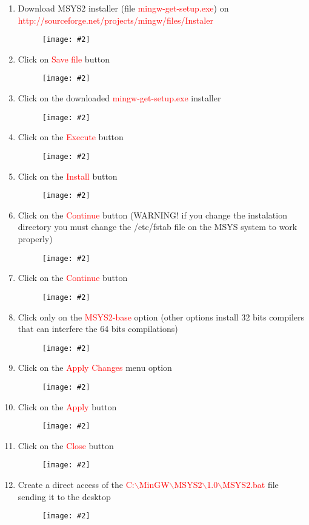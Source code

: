 \documentclass[a4paper]{article}
\newcommand{\FIG}[2]
{
	\begin{figure}[ht!]
	\centering
	\texttt{[image: \#2]}
	\end{figure}
}
\newcommand{\FIGURE}[1]{\FIG{0.35}{#1}}
\newcommand{\RED}[1] {\textcolor{red}{#1}}
\begin{document}
\begin{enumerate}

\item Download MSYS2 installer (file \RED{mingw-get-setup.exe}) on \newline
\RED{http://sourceforge.net/projects/mingw/files/Instaler}

\FIGURE{MSYS2-1.png.eps}

\item Click on \RED{Save file} button
\FIGURE{MSYS2-2.png.eps}

\clearpage

\item Click on the downloaded \RED{mingw-get-setup.exe} installer
\FIGURE{MSYS2-3.png.eps}

\item Click on the \RED{Execute} button
\FIGURE{MSYS2-4.png.eps}

\clearpage

\item Click on the \RED{Install} button
\FIGURE{MSYS2-5.png.eps}

\item Click on the \RED{Continue} button (WARNING! if you change the instalation
directory you must change the /etc/fstab file on the MSYS system to work
properly)
\FIGURE{MSYS2-6.png.eps}

\clearpage

\item Click on the \RED{Continue} button
\FIGURE{MSYS2-7.png.eps}

\item Click only on the \RED{MSYS2-base} option (other options install 32 bits
compilers that can interfere the 64 bits compilations)
\FIGURE{MSYS2-8.png.eps}

\clearpage

\item Click on the \RED{Apply Changes} menu option
\FIGURE{MSYS2-9.png.eps}

\item Click on the \RED{Apply} button
\FIGURE{MSYS2-10.png.eps}

\clearpage

\item Click on the \RED{Close} button
\FIGURE{MSYS2-11.png.eps}

\item Create a direct access of the
\RED{C:$\backslash$MinGW$\backslash$MSYS2$\backslash$1.0$\backslash$MSYS2.bat}
file sending it to the desktop
\FIGURE{MSYS2-12.png.eps}


\end{enumerate}
\end{document}
